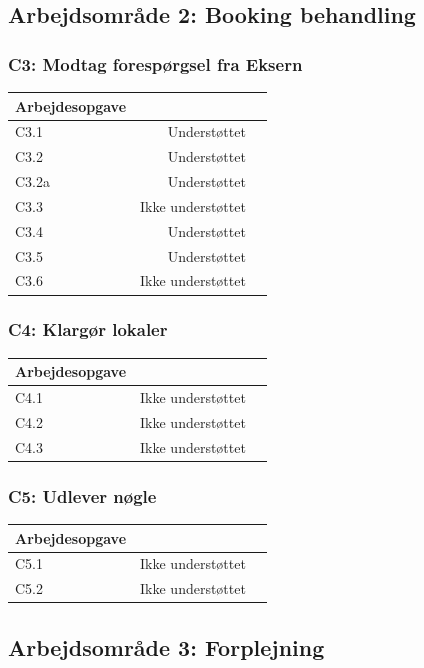 \subsection{Arbejdsområde 2: Booking behandling}
\label{Baggrund_Arb_opgaver_Booking_behandling}
\subsubsection{C3: Modtag forespørgsel fra Eksern}
\begin{tabular}{ | l | r | p{} |}
	\hline
	Arbejdesopgave & \\ 
\hline
	C3.1 & Understøttet \\ 
\hline
	C3.2 & Understøttet \\ 
\hline
	C3.2a & Understøttet \\ 
\hline
	C3.3 & Ikke understøttet \\ 
\hline
	C3.4 & Understøttet \\ 
\hline
	C3.5 & Understøttet \\ 
\hline
	C3.6 & Ikke understøttet \\ 
\hline
\end{tabular}

\subsubsection{C4: Klargør lokaler}
\begin{tabular}{ | l | r | p{} |}
	\hline
	Arbejdesopgave &\\ 
\hline
	C4.1 & Ikke understøttet \\ 
\hline
	C4.2 & Ikke understøttet \\ 
\hline
	C4.3 & Ikke understøttet \\ 
\hline
\end{tabular}

\subsubsection{C5: Udlever nøgle}
\begin{tabular}{ | l | r | p{} |}
	\hline
	Arbejdesopgave & \\ 
\hline
	C5.1 & Ikke understøttet \\ 
\hline
	C5.2 & Ikke understøttet \\ 
\hline
\end{tabular}

\subsection{Arbejdsområde 3: Forplejning}
\label{Baggrund_Arb_opgaver_Forplejning}
